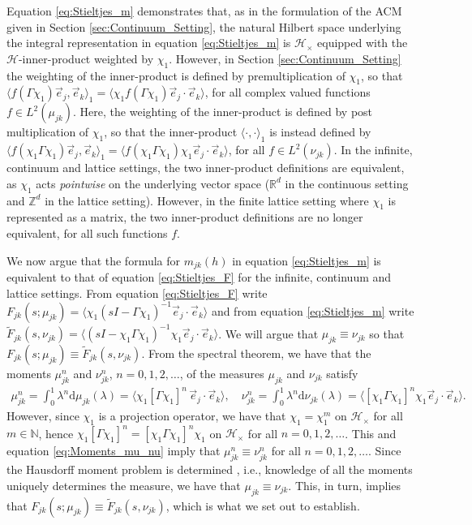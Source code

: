 \documentclass{cmslatex}
\renewcommand{\d}{\text{d}}
\begin{document}
Equation \eqref{eq:Stieltjes_m} demonstrates that, as in the formulation
of the ACM given in Section \ref{sec:Continuum_Setting}, the natural
Hilbert space underlying the integral representation in equation
\eqref{eq:Stieltjes_m} is $\mathscr{H}_\times$ equipped with the
$\mathscr{H}$-inner-product weighted by $\chi_1$. However, in Section
\ref{sec:Continuum_Setting} the weighting of the inner-product is
defined by premultiplication of $\chi_1$, so that
$\langle f(\Gamma\chi_1)\vec{e}_j,\vec{e}_k\rangle_1=\langle\chi_1f(\Gamma\chi_1)\vec{e}_j\cdot\vec{e}_k\rangle$, for
all complex valued functions $f\in L^2(\mu_{jk})$. Here, the weighting of
the inner-product is defined by post multiplication of $\chi_1$, so that
the inner-product $\langle\cdot,\cdot\rangle_1$ is instead defined by
$\langle f(\chi_1\Gamma\chi_1)\vec{e}_j,\vec{e}_k\rangle_1=\langle f(\chi_1\Gamma\chi_1)\chi_1\vec{e}_j\cdot\vec{e}_k\rangle$,
for all $f\in L^2(\nu_{jk})$. In the infinite, continuum and lattice
settings, the two inner-product definitions are equivalent, as $\chi_1$
acts \emph{pointwise} on the underlying vector space ($\mathbb{R}^d$
in the continuous setting and $\mathbb{Z}^d$ in the lattice
setting). However, in the finite lattice setting where $\chi_1$ is
represented as a matrix, the two inner-product definitions are no
longer equivalent, for all such functions $f$. 



We now argue that the formula for $m_{jk}(h)$ in equation
\eqref{eq:Stieltjes_m} is equivalent to that of equation
\eqref{eq:Stieltjes_F} for the infinite, continuum and lattice
settings. From equation \eqref{eq:Stieltjes_F} write 
$F_{jk}(s;\mu_{jk})=\langle\chi_1(sI-\Gamma\chi_1)^{-1}\vec{e}_j\cdot\vec{e}_k\rangle$ and from equation
\eqref{eq:Stieltjes_m} write
$\tilde{F}_{jk}(s,\nu_{jk})=\langle(sI-\chi_1\Gamma\chi_1)^{-1}\chi_1\vec{e}_j\cdot\vec{e}_k\rangle$. We will
argue that $\mu_{jk}\equiv\nu_{jk}$ so that
$F_{jk}(s;\mu_{jk})\equiv\tilde{F}_{jk}(s,\nu_{jk})$. From the spectral
theorem, we have that the moments $\mu^n_{jk}$ and $\nu^n_{jk}$,
$n=0,1,2,\ldots$, of the measures $\mu_{jk}$ and $\nu_{jk}$ satisfy 
%
\begin{align}\label{eq:Moments_mu_nu}
   \mu_{jk}^n=\int_0^1\lambda^n\d\mu_{jk}(\lambda)=\langle\chi_1[\Gamma\chi_1]^n\,\vec{e}_j\cdot\vec{e}_k\rangle, \quad
   \nu_{jk}^n=\int_0^1\lambda^n\d\nu_{jk}(\lambda)=\langle[\chi_1\Gamma\chi_1]^n\chi_1\vec{e}_j\cdot\vec{e}_k\rangle.
\end{align}
%
However, since $\chi_1$ is a projection operator, we have that
$\chi_1=\chi_1^m$ on $\mathscr{H}_\times$ for all $m\in\mathbb{N}$, hence
$\chi_1[\Gamma\chi_1]^n=[\chi_1\Gamma\chi_1]^n\chi_1$ on $\mathscr{H}_\times$ for all
$n=0,1,2,\ldots$. This and equation \eqref{eq:Moments_mu_nu} imply that
$\mu^n_{jk}\equiv\nu^n_{jk}$  for all $n=0,1,2,\ldots$. Since the Hausdorff moment
problem is determined \cite{Shohat:1963}, i.e., knowledge of all the
moments uniquely determines the measure, we have that
$\mu_{jk}\equiv\nu_{jk}$. This, in turn, implies that
$F_{jk}(s;\mu_{jk})\equiv\tilde{F}_{jk}(s,\nu_{jk})$, which is what we set out
to establish.
\end{document}
